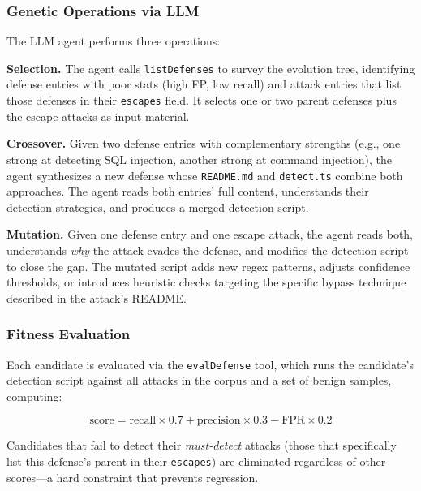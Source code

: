 \subsubsection{Genetic Operations via LLM}

The LLM agent performs three operations:

\textbf{Selection.} The agent calls \texttt{listDefenses} to survey the evolution tree, identifying defense entries with poor stats (high FP, low recall) and attack entries that list those defenses in their \texttt{escapes} field. It selects one or two parent defenses plus the escape attacks as input material.

\textbf{Crossover.} Given two defense entries with complementary strengths (e.g., one strong at detecting SQL injection, another strong at command injection), the agent synthesizes a new defense whose \texttt{README.md} and \texttt{detect.ts} combine both approaches. The agent reads both entries' full content, understands their detection strategies, and produces a merged detection script.

\textbf{Mutation.} Given one defense entry and one escape attack, the agent reads both, understands \emph{why} the attack evades the defense, and modifies the detection script to close the gap. The mutated script adds new regex patterns, adjusts confidence thresholds, or introduces heuristic checks targeting the specific bypass technique described in the attack's README.

\subsubsection{Fitness Evaluation}

Each candidate is evaluated via the \texttt{evalDefense} tool, which runs the candidate's detection script against all attacks in the corpus and a set of benign samples, computing:

\[
\text{score} = \text{recall} \times 0.7 + \text{precision} \times 0.3 - \text{FPR} \times 0.2
\]

Candidates that fail to detect their \emph{must-detect} attacks (those that specifically list this defense's parent in their \texttt{escapes}) are eliminated regardless of other scores---a hard constraint that prevents regression.

